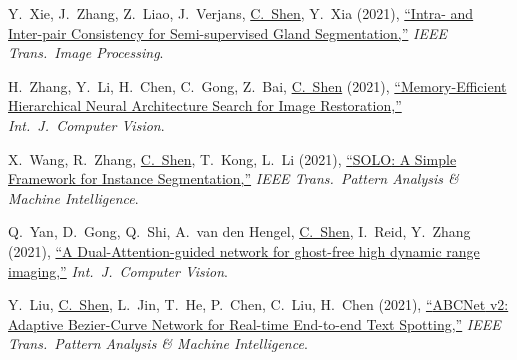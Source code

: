 \documentclass[9pt, a4paper]{article}
\newcommand{\years}[1]{\marginnote{\scriptsize #1}}
\def\highlight{\uline}
\begin{document}
\medskip

\years{2021} Y.~Xie, J.~Zhang, Z.~Liao, J.~Verjans, \highlight{C.~Shen}, Y.~Xia (2021),
\href{http://www.google.com/search?lr=&ie=UTF-8&oe=UTF-8&q=Intra-+and+Inter-pair+Consistency+for+Semi-supervised+Gland+Segmentation+Yutong+Xie%2C+Jianpeng+Zhang%2C+Zhibin+Liao%2C+Johan+Verjans%2C+Chunhua+Shen%2C+Yong+Xia}{``Intra- and Inter-pair Consistency for Semi-supervised Gland Segmentation,{}''}
\emph{IEEE Trans.\  Image Processing}.

\medskip

\years{2021} H.~Zhang, Y.~Li, H.~Chen, C.~Gong, Z.~Bai, \highlight{C.~Shen} (2021),
\href{http://www.google.com/search?lr=&ie=UTF-8&oe=UTF-8&q=Memory-Efficient+Hierarchical+Neural+Architecture+Search+for+Image+Restoration+Haokui+Zhang%2C+Ying+Li%2C+Hao+Chen%2C+Chengrong+Gong%2C+Zongwen+Bai%2C+Chunhua+Shen}{``Memory-Efficient Hierarchical Neural Architecture Search for Image Restoration,{}''}
\emph{Int.\ J.\  Computer Vision}.

\medskip

\years{2021} X.~Wang, R.~Zhang, \highlight{C.~Shen}, T.~Kong, L.~Li (2021),
\href{http://www.google.com/search?lr=&ie=UTF-8&oe=UTF-8&q=SOLO%3A+A+Simple+Framework+for+Instance+Segmentation+Xinlong+Wang%2C+Rufeng+Zhang%2C+Chunhua+Shen%2C+Tao+Kong%2C+Lei+Li}{``{SOLO}: A Simple Framework for Instance Segmentation,{}''}
\emph{IEEE Trans.\  Pattern Analysis \& Machine Intelligence}.

\medskip

\years{2021} Q.~Yan, D.~Gong, Q.~Shi, A.~van den Hengel, \highlight{C.~Shen}, I.~Reid, Y.~Zhang (2021),
\href{http://www.google.com/search?lr=&ie=UTF-8&oe=UTF-8&q=A+Dual-Attention-guided+network+for+ghost-free+high+dynamic+range+imaging+Qingsen+Yan%2C+Dong+Gong%2C+Qinfeng+Shi%2C+Anton+van+den+Hengel%2C+Chunhua+Shen%2C+Ian+Reid%2C+Yanning+Zhang}{``A Dual-Attention-guided network for ghost-free high dynamic range imaging,{}''}
\emph{Int.\ J.\  Computer Vision}.

\medskip

\years{2021} Y.~Liu, \highlight{C.~Shen}, L.~Jin, T.~He, P.~Chen, C.~Liu, H.~Chen (2021),
\href{http://www.google.com/search?lr=&ie=UTF-8&oe=UTF-8&q=ABCNet+v2%3A+Adaptive+Bezier-Curve+Network+for+Real-time+End-to-end+Text+Spotting+Yuliang+Liu%2C+Chunhua+Shen%2C+Lianwen+Jin%2C+Tong+He%2C+Peng+Chen%2C+Chongyu+Liu%2C+Hao+Chen}{``{ABCNet} v2: Adaptive Bezier-Curve Network for Real-time End-to-end Text Spotting,{}''}
\emph{IEEE Trans.\  Pattern Analysis \& Machine Intelligence}.
\end{document}
